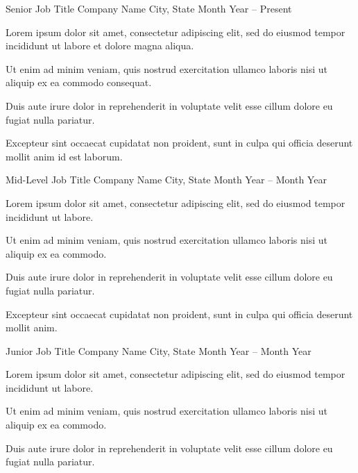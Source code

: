 \begin{experience}

\cventry
  {Senior Job Title}
  {Company Name}
  {City, State}
  {Month Year -- Present}
  {
    \begin{cvitems}
      \item Lorem ipsum dolor sit amet, consectetur adipiscing elit, sed do eiusmod tempor incididunt ut labore et dolore magna aliqua.
      \item Ut enim ad minim veniam, quis nostrud exercitation ullamco laboris nisi ut aliquip ex ea commodo consequat.
      \item Duis aute irure dolor in reprehenderit in voluptate velit esse cillum dolore eu fugiat nulla pariatur.
      \item Excepteur sint occaecat cupidatat non proident, sunt in culpa qui officia deserunt mollit anim id est laborum.
    \end{cvitems}
  }

\cventry
  {Mid-Level Job Title}
  {Company Name}
  {City, State}
  {Month Year -- Month Year}
  {
    \begin{cvitems}
      \item {Lorem ipsum dolor sit amet, consectetur adipiscing elit, sed do eiusmod tempor incididunt ut labore.}
      \item {Ut enim ad minim veniam, quis nostrud exercitation ullamco laboris nisi ut aliquip ex ea commodo.}
      \item {Duis aute irure dolor in reprehenderit in voluptate velit esse cillum dolore eu fugiat nulla pariatur.}
      \item {Excepteur sint occaecat cupidatat non proident, sunt in culpa qui officia deserunt mollit anim.}
    \end{cvitems}
  }

\cventry
  {Junior Job Title}
  {Company Name}
  {City, State}
  {Month Year -- Month Year}
  {
    \begin{cvitems}
      \item {Lorem ipsum dolor sit amet, consectetur adipiscing elit, sed do eiusmod tempor incididunt ut labore.}
      \item {Ut enim ad minim veniam, quis nostrud exercitation ullamco laboris nisi ut aliquip ex ea commodo.}
      \item {Duis aute irure dolor in reprehenderit in voluptate velit esse cillum dolore eu fugiat nulla pariatur.}
    \end{cvitems}
  }

\end{experience}
